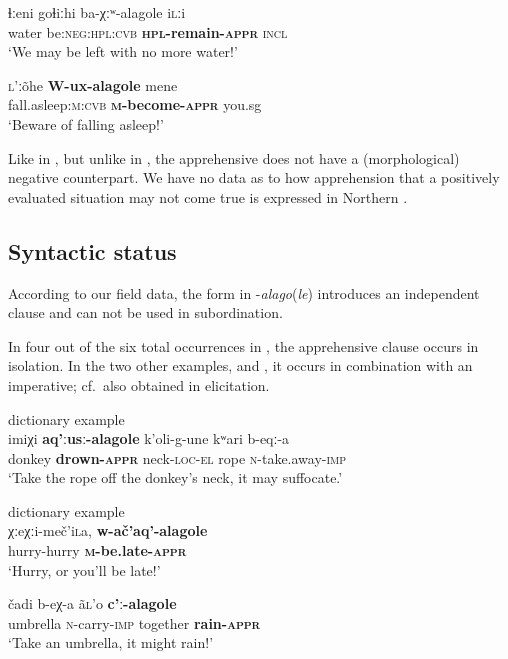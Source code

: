 \documentclass[output=paper,colorlinks,citecolor=brown]{langscibook}
\begin{document}
\ea \label{ex:DD68}
\gll ɬːeni goɬiːhi ba-χːʷ-alagole i\textsc{l}ːi \\
water be:\textsc{neg:hpl:cvb} \textbf{\textsc{hpl}-remain-\textsc{appr}} \textsc{incl} \\
\glt `We may be left with no more water!'
\z


\ea \label{ex:DD69}
\gll \textsc{l}'ːõhe \textbf{W-ux-alagole} mene \\
fall.asleep:\textsc{m:cvb} \textbf{\textsc{m}-become-\textsc{appr}} you.sg \\
\glt `Beware of falling asleep!'
\z


 Like in , but unlike in , the apprehensive does not have a (morphological) negative counterpart. We have no data as to how apprehension that a positively evaluated situation may not come true is expressed in Northern .
 

\subsection{Syntactic status}
\label{subsec:NAsyntactic}
 
According to our field data, the form in \nobreakdash-\textit{alago}(\textit{le}) introduces an independent clause and can not be used in subordination. 

In four out of the six total occurrences in \citet{MagomedovaAbdulaeva2007}, the apprehensive clause occurs in isolation. In the two other examples,  and , it occurs in combination with an imperative; cf.\ also  obtained in elicitation. 

\ea \label{ex:DD70} \textnormal{dictionary example} \\
\gll imiχi \textbf{aq'ːusː-alagole} k'oli-g-une  kʷari  b-eqː-a  \\
donkey \textbf{drown-\textsc{appr}} neck-\textsc{loc-el} rope \textsc{n}-take.away-\textsc{imp} \\
\glt `Take the rope off the donkey's neck, it may suffocate.'
\z

\ea \label{ex:DD71} \textnormal{dictionary example} \\
\gll χːeχːi-meč'i\textsc{l}a, \textbf{w-ač'aq'-alagole} \\
hurry-hurry \textbf{\textsc{m}-be.late-\textsc{appr}} \\
\glt `Hurry, or you'll be late!'
\z

\ea \label{ex:DD72}
\gll čadi b-eχ-a ã\textsc{l}'o \textbf{c'ː-alagole} \\
umbrella \textsc{n}-carry-\textsc{imp} together \textbf{rain-\textsc{appr}} \\
\glt `Take an umbrella, it might rain!'
\z  
\end{document}

